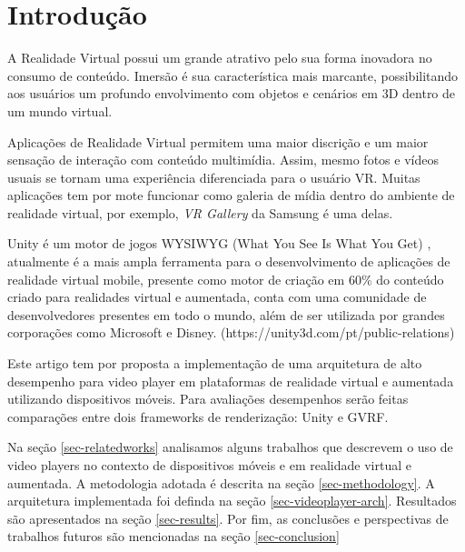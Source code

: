 \section{Introdução}


A Realidade Virtual possui um grande atrativo pelo sua forma inovadora no consumo de conteúdo. Imersão é sua característica mais marcante, possibilitando aos usuários um profundo envolvimento com objetos e cenários em 3D dentro de um mundo virtual.



Aplicações de Realidade Virtual permitem uma maior discrição e um maior sensação de interação com conteúdo multimídia. Assim, mesmo fotos e vídeos usuais se tornam uma experiência diferenciada para o usuário VR. Muitas aplicações tem por mote funcionar como galeria de mídia dentro do ambiente de realidade virtual, por exemplo, \textit{VR Gallery} da Samsung é uma delas.

Unity é um motor de jogos WYSIWYG (What You See Is What You Get) \cite{sv2015popolin}, atualmente é a mais ampla ferramenta para o desenvolvimento de aplicações de realidade virtual mobile, presente como motor de criação em 60\% do conteúdo criado para realidades virtual e aumentada, conta com uma comunidade de desenvolvedores presentes em todo o mundo, além de ser utilizada por grandes corporações como Microsoft e Disney. (https://unity3d.com/pt/public-relations)

Este artigo tem por proposta a implementação de uma arquitetura de alto desempenho para video player em plataformas de realidade virtual e aumentada utilizando dispositivos móveis. Para avaliações desempenhos serão feitas comparações entre dois frameworks de renderização: Unity e GVRF.

Na seção \ref{sec-relatedworks} analisamos alguns trabalhos que descrevem o uso de video players no contexto de dispositivos móveis e em realidade virtual e aumentada. A metodologia adotada é descrita na seção \ref{sec-methodology}. A arquitetura implementada foi definda na seção \ref{sec-videoplayer-arch}. Resultados são apresentados na seção \ref{sec-results}. Por fim, as conclusões e perspectivas de trabalhos futuros são mencionadas na seção \ref{sec-conclusion}